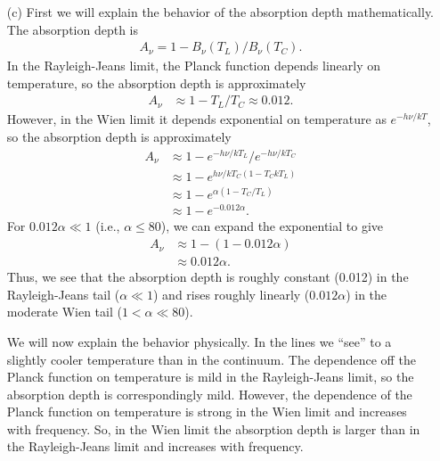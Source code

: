 \begin{problem}
\begin{enumerate}
\item[(c)] First we will explain the behavior of the absorption depth mathematically. The absorption depth is
\begin{align}
A_\nu = 1- B_\nu(T_L)/B_\nu(T_C).
\end{align}
In the Rayleigh-Jeans limit, the Planck function depends linearly on temperature,  so the absorption depth is approximately
\begin{align}
A_\nu &\approx 1 - T_L/T_C \approx 0.012.
\end{align}
However, in the Wien limit it depends exponential on temperature as $e^{-h\nu/kT}$, so the absorption depth is approximately
\begin{align}
A_\nu &\approx 1 - e^{-h\nu/kT_L}/e^{-h\nu/kT_C}\\
&\approx 1 - e^{h\nu/kT_C(1-T_CkT_L)}\\
&\approx 1 - e^{\alpha(1-T_C/T_L)}\\
&\approx 1 - e^{-0.012\alpha}.
\end{align}
For $0.012\alpha \ll 1$ (i.e., $\alpha \le 80$), we can expand the exponential  to give
\begin{align}
A_\nu &\approx 1-(1-0.012\alpha)\\
&\approx 0.012\alpha.
\end{align}
Thus, we see that the absorption depth is roughly constant (0.012) in the Rayleigh-Jeans tail ($\alpha \ll 1$) and rises roughly linearly ($0.012\alpha$) in the moderate Wien tail ($1 < \alpha \ll 80$).

We will now explain the behavior physically. In the lines we “see” to a slightly cooler temperature than in the continuum. The dependence off the Planck function on temperature is mild in the Rayleigh-Jeans limit, so the absorption depth is correspondingly mild. However, the dependence of the Planck function on temperature is strong in the Wien limit and increases with frequency. So, in the Wien limit the absorption depth is larger than in the Rayleigh-Jeans limit and increases with frequency.

\end{enumerate}
\end{problem}

